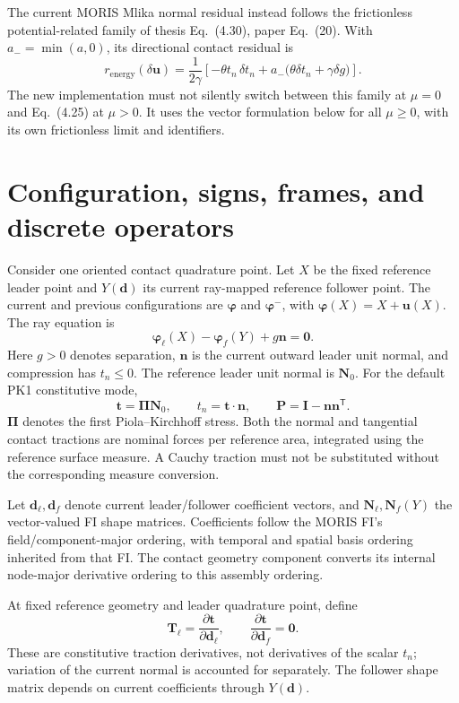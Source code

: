 \documentclass[11pt,a4paper]{article}
\newcommand{\tr}{^{\mathsf T}}
\newcommand{\Id}{\bm I}
\newcommand{\vn}{\bm n}
\newcommand{\vN}{\bm N_0}
\newcommand{\vt}{\bm t}
\newcommand{\Proj}{\bm P}
\newcommand{\Nm}{\bm N}
\newcommand{\Tm}{\bm T}
\begin{document}
The current MORIS Mlika normal residual instead follows the frictionless
potential-related family of thesis Eq.~(4.30), paper Eq.~(20). With $a_-=\min(a,0)$,
its directional contact residual is
\begin{equation}\label{eq:oldnormal}
 r_{\mathrm{energy}}(\delta\bm u)
 =\frac{1}{2\gamma}
 \left[-\theta t_n\,\delta t_n
       +a_-\bigl(\theta\delta t_n+\gamma\delta g\bigr)\right].
\end{equation}
The new implementation must not silently switch between this family at
$\mu=0$ and Eq.~(4.25) at $\mu>0$. It uses the vector formulation below for
all $\mu\geq0$, with its own frictionless limit and identifiers.

\section{Configuration, signs, frames, and discrete operators}
Consider one oriented contact quadrature point. Let $X$ be the fixed reference
leader point and $Y(\bm d)$ its current ray-mapped reference follower point.
The current and previous configurations are $\bm\varphi$ and
$\bm\varphi^-$, with $\bm\varphi(X)=X+\bm u(X)$. The ray equation is
\begin{equation}\label{eq:ray}
 \bm\varphi_\ell(X)-\bm\varphi_f(Y)+g\vn=\bm0.
\end{equation}
Here $g>0$ denotes separation, $\vn$ is the current outward leader unit normal,
and compression has $t_n\leq0$. The reference leader unit normal is $\vN$.
For the default PK1 constitutive mode,
\begin{equation}
 \vt=\bm\Pi\vN,\qquad t_n=\vt\cdot\vn,
 \qquad \Proj=\Id-\vn\vn\tr.
\end{equation}
$\bm\Pi$ denotes the first Piola--Kirchhoff stress. Both the normal and tangential
contact tractions are nominal forces per reference area, integrated using the
reference surface measure. A Cauchy traction must not be substituted without the
corresponding measure conversion.

Let $\bm d_\ell,\bm d_f$ denote current leader/follower coefficient vectors, and
$\Nm_\ell,\Nm_f(Y)$ the vector-valued FI shape matrices. Coefficients follow the
MORIS FI's field/component-major ordering, with temporal and spatial basis
ordering inherited from that FI. The contact geometry component converts its
internal node-major derivative ordering to this assembly ordering.

At fixed reference geometry and leader quadrature point, define
\begin{equation}\label{eq:T}
 \Tm_\ell=\frac{\partial\vt}{\partial\bm d_\ell},\qquad
 \frac{\partial\vt}{\partial\bm d_f}=\bm0.
\end{equation}
These are constitutive traction derivatives, not derivatives of the scalar
$t_n$; variation of the current normal is accounted for separately. The follower
shape matrix depends on current coefficients through $Y(\bm d)$.
\end{document}

